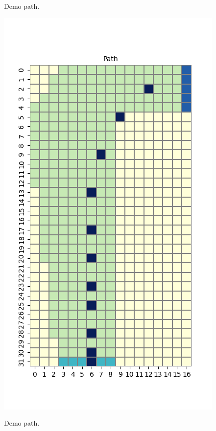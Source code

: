 \documentclass[11pt]{article}
\begin{document}
    Demo path.

    \includegraphics[scale=0.7]{env2_demo_e_5_12_6}

    Demo path.
\end{document}
